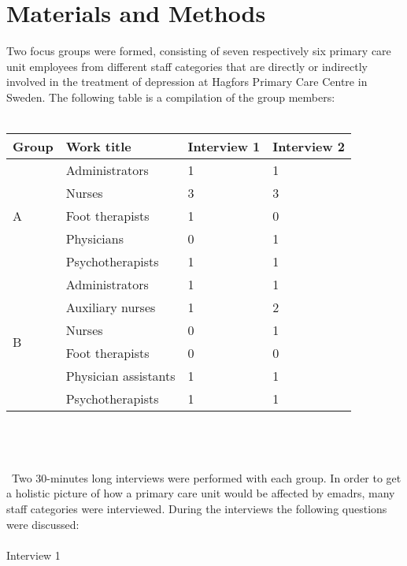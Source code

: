 \documentclass[12pt,a4paper,oneside]{article}
\let\oldcite\cite
\renewcommand*\cite[1]{\textsuperscript{\oldcite{#1}}}
\begin{document}
\section*{Materials and Methods}
Two focus groups were formed, consisting of seven respectively six primary care unit employees from different staff categories that are directly or indirectly involved in the treatment of depression at Hagfors Primary Care Centre in Sweden. The following table is a compilation of the group members:\\\\
\begin{tabular}{p{3em}|p{10em}|l|l}
Group & Work title & Interview 1 & Interview 2 \\
\hline
\multirow{ 5}{*}{A} & Administrators & 1 & 1 \\
& Nurses & 3 & 3 \\
& Foot therapists & 1 & 0\\
& Physicians & 0 & 1\\
& Psychotherapists & 1 & 1\\
\hline
\multirow{ 6}{*}{B} & Administrators & 1 & 1 \\
& Auxiliary nurses & 1 & 2 \\
& Nurses & 0 & 1 \\
& Foot therapists & 0 & 0\\
& Physician assistants & 1 & 1\\
& Psychotherapists & 1 & 1\\
\hline
\end{tabular}\\ \\\ \\\ 
Two 30-minutes long interviews were performed with each group. In order to get a holistic picture of how a primary care unit would be affected by e{\sc madrs}, many staff categories were interviewed\cite{goal1}. During the interviews the following questions were discussed:\\\ \\
Interview 1
\end{document}
